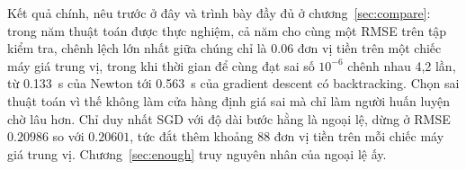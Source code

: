 Kết quả chính, nêu trước ở đây và trình bày đầy đủ ở chương~\ref{sec:compare}:
trong năm thuật toán được thực nghiệm, cả năm cho cùng một RMSE trên tập kiểm
tra, chênh lệch lớn nhất giữa chúng chỉ là \num{0.06} đơn vị tiền trên một chiếc
máy giá trung vị, trong khi thời gian để cùng đạt sai số $10^{-6}$ chênh nhau 4,2
lần, từ \SI{0.133}{\second} của Newton tới \SI{0.563}{\second} của gradient
descent có backtracking.
Chọn sai thuật toán vì thế không làm cửa hàng định giá sai mà chỉ làm người huấn
luyện chờ lâu hơn. Chỉ duy nhất SGD với độ dài bước hằng là ngoại lệ, dừng ở RMSE
$\num{0.20986}$ so với $\num{0.20601}$, tức đắt thêm khoảng 88 đơn vị tiền trên
mỗi chiếc máy giá trung vị. Chương~\ref{sec:enough} truy nguyên nhân của ngoại lệ
ấy.
